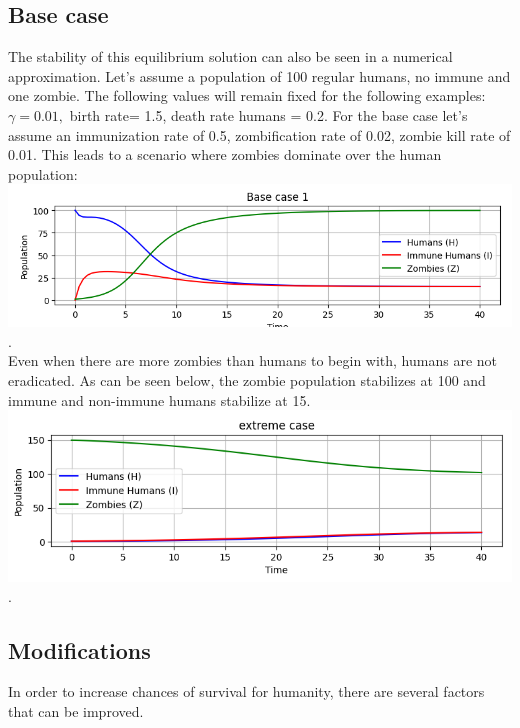 \documentclass[
	12pt
]{article}
\begin{document}
\subsection{Base case}
The stability of this equilibrium solution can also be seen in a numerical approximation. Let's assume a population of 100 regular humans, no immune and one zombie. The following values will remain fixed for the following examples: $\gamma= 0.01,$ birth rate= 1.5, death rate humans = 0.2. For the base case let's assume an immunization rate of 0.5, zombification rate of 0.02, zombie kill rate of 0.01. This leads to a scenario where zombies dominate over the human population:\\
\includegraphics[width=\textwidth]{base case.png}. \\
Even when there are more zombies than humans to begin with, humans are not eradicated. As can be seen below, the zombie population stabilizes at 100 and immune and non-immune humans stabilize at 15.\\
\includegraphics[width=\textwidth]{extreme case.png}.\\
\subsection{Modifications}
In order to increase chances of survival for humanity, there are several factors that can be improved.
\end{document}
